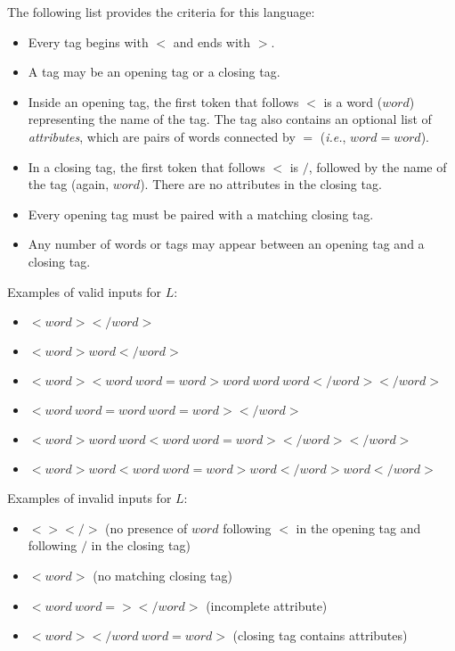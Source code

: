 \documentclass{article}[12pt]
\begin{document}
\begin{enumerate}
    The following list provides the criteria for this language:

    \begin{itemize}
        \item Every tag begins with $<$ and ends with $>$.
        \item A tag may be an opening tag or a closing tag.
        \item Inside an opening tag, the first token that follows  $<$ is a word ($word$) representing the name of the tag. The tag also contains an optional list of \textit{attributes}, which are pairs of words connected by $=$ (\textit{i.e.}, $word=word$).
        \item In a closing tag, the first token that follows $<$ is $/$, followed by the name of the tag (again, $word$). There are no attributes in the closing tag.
        \item Every opening tag must be paired with a matching closing tag.
        \item Any number of words or tags may appear between an opening tag and a closing tag.
    \end{itemize}
    
    Examples of valid inputs for $L$:
    \begin{itemize}
        \item $<word></word>$
        \item $<word>word</word>$
        \item $<word><word~word=word>word~word~word</word></word>$
        \item $<word~word=word~word=word></word>$
        \item $<word>word~word<word~word=word></word></word>$
        \item $<word>word<word~word=word>word</word>word</word>$
    \end{itemize}
    Examples of invalid inputs for $L$:
    \begin{itemize}
        \item $<></>$ (no presence of $word$ following $<$ in the opening tag and following $/$ in the closing tag)
        \item $<word>$ (no matching closing tag)
        \item $<word~word=></word>$ (incomplete attribute)
        \item $<word></word~word=word>$ (closing tag contains attributes)
    \end{itemize}
    

\end{enumerate}
\end{document}
